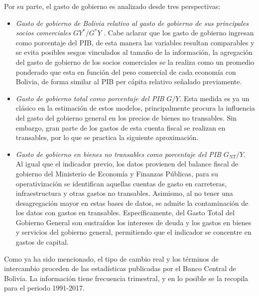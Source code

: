\documentclass[12pt,letterpaper]{article}
\begin{document}
Por su parte, el gasto de gobierno es analizado desde tres perspectivas: 
\begin{itemize}
\item \emph{Gasto de gobierno de Bolivia relativo al gasto de gobierno de sus principales socios comerciales} $GY^*/G^*Y$	. Cabe aclarar que los gasto de gobierno ingresan como porcentaje del PIB, de esta manera las variables resultan comparables y se evita posibles sesgos vinculados al tamaño de la información, la agregación del gasto de gobierno de los socios comerciales se la realiza como un promedio ponderado que esta en función del peso comercial de cada economía con Bolivia, de forma similar al PIB per cápita relativo señalado previamente.
\item \emph{Gasto de gobierno total como porcentaje del PIB} $G/Y$. Esta medida es ya un clásico en la estimación de estos modelos, principalmente procura la influencia del gasto del gobierno general en los precios de bienes no transables. Sin embargo, gran parte de los gastos de esta cuenta fiscal se realizan en transables, por lo que se practica la siguiente aproximación.
\item \emph{Gasto de gobierno en bienes no transables como porcentaje del PIB} $G_{NT}/Y$. Al igual que el indicador previo, los datos provienen del balance fiscal de gobierno del Ministerio de Economía y Finanzas  Públicas, para su operativización se identifican aquellas cuentas de gasto en carreteras, infraestructura y otras gastos no transables. Asimismo, al no tener una desagregación mayor en estas bases de datos, se admite la contaminación de los datos con gastos en transables. Específicamente, del Gasto Total del Gobierno General son sustraídos los intereses de deuda y los gastos en bienes y servicios del gobierno general, permitiendo que el indicador se concentre en gastos de capital.
\end{itemize}

Como ya ha sido mencionado, el tipo de cambio real y los términos de intercambio proceden de las estadísticas publicadas por el Banco Central de Bolivia. La información tiene frecuencia trimestral, y en lo posible se la recopila para el periodo 1991-2017. 
\end{document}
